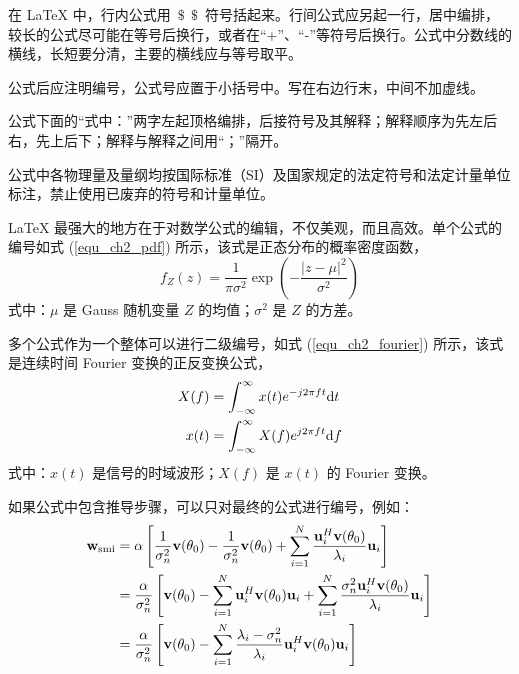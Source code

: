 
在 \LaTeX{} 中，行内公式用~$\$\ \ \$$~符号括起来。行间公式应另起一行，居中编排，较长的公式尽可能在等号后换行，或者在“+”、“-”等符号后换行。公式中分数线的横线，长短要分清，主要的横线应与等号取平。

公式后应注明编号，公式号应置于小括号中。写在右边行末，中间不加虚线。

公式下面的“式中：”两字左起顶格编排，后接符号及其解释；解释顺序为先左后右，先上后下；解释与解释之间用“；”隔开。

公式中各物理量及量纲均按国际标准（SI）及国家规定的法定符号和法定计量单位标注，禁止使用已废弃的符号和计量单位。


\LaTeX{} 最强大的地方在于对数学公式的编辑，不仅美观，而且高效。单个公式的编号如式 (\ref{equ_ch2_pdf}) 所示，该式是正态分布的概率密度函数，
\begin{equation} \label{equ_ch2_pdf}
	f_Z(z) = \frac{1}{\pi\sigma^2} \exp\left(-\frac{|z-\mu|^2}{\sigma^2}\right)
\end{equation}
式中：$\mu$ 是 Gauss 随机变量 $Z$ 的均值；$\sigma^2$ 是 $Z$ 的方差。


多个公式作为一个整体可以进行二级编号，如式 (\ref{equ_ch2_fourier}) 所示，该式是连续时间 Fourier 变换的正反变换公式，
\begin{subequations} \label{equ_ch2_fourier}
	\begin{align}
		X(f) &= \int_{-\infty}^{\infty}x(t)e^{-j2\pi f t}\mathrm{d} t \\
		x(t) &= \int_{-\infty}^{\infty}X(f)e^{j2\pi f t}\mathrm{d} f
	\end{align}
\end{subequations}
式中：$x(t)$ 是信号的时域波形；$X(f)$ 是 $x(t)$ 的 Fourier 变换。

如果公式中包含推导步骤，可以只对最终的公式进行编号，例如：
\begin{align}
	\mathbf{w}_{\mathrm{smi}} &= \alpha \left[\frac{1}{\sigma_n^2}\mathbf{v}(\theta_0) - \frac{1}{\sigma_n^2}\mathbf{v}(\theta_0) + \sum_{i=1}^{N} \frac{\mathbf{u}_i^H\mathbf{v}(\theta_0)}{\lambda_i} \mathbf{u}_i\right] \nonumber \\
	&= \frac{\alpha}{\sigma_n^2} \left[\mathbf{v}(\theta_0) - \sum_{i=1}^{N}\mathbf{u}_i^H\mathbf{v}(\theta_0)\mathbf{u}_i +  \sum_{i=1}^{N}\frac{\sigma_n^2\mathbf{u}_i^H\mathbf{v}(\theta_0)}{\lambda_i} \mathbf{u}_i \right] \nonumber \\
	&= \frac{\alpha}{\sigma_n^2} \left[\mathbf{v}(\theta_0) - \sum_{i=1}^{N} \frac{\lambda_i-\sigma_n^2}{\lambda_i} \mathbf{u}_i^H\mathbf{v}(\theta_0)\mathbf{u}_i \right]
\end{align}
